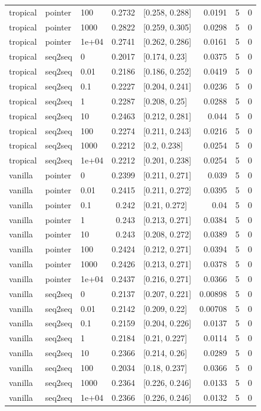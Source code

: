 \documentclass[10pt]{article}
\begin{document}
{\begin{longtable}{lllrlrrr}
tropical & pointer & 100 & 0.2732 & [0.258, 0.288] & 0.0191 & 5 & 0\\
tropical & pointer & 1000 & 0.2822 & [0.259, 0.305] & 0.0298 & 5 & 0\\
tropical & pointer & 1e+04 & 0.2741 & [0.262, 0.286] & 0.0161 & 5 & 0\\
tropical & seq2seq & 0 & 0.2017 & [0.174, 0.23] & 0.0375 & 5 & 0\\
tropical & seq2seq & 0.01 & 0.2186 & [0.186, 0.252] & 0.0419 & 5 & 0\\
tropical & seq2seq & 0.1 & 0.2227 & [0.204, 0.241] & 0.0236 & 5 & 0\\
tropical & seq2seq & 1 & 0.2287 & [0.208, 0.25] & 0.0288 & 5 & 0\\
tropical & seq2seq & 10 & 0.2463 & [0.212, 0.281] & 0.044 & 5 & 0\\
tropical & seq2seq & 100 & 0.2274 & [0.211, 0.243] & 0.0216 & 5 & 0\\
tropical & seq2seq & 1000 & 0.2212 & [0.2, 0.238] & 0.0254 & 5 & 0\\
tropical & seq2seq & 1e+04 & 0.2212 & [0.201, 0.238] & 0.0254 & 5 & 0\\
vanilla & pointer & 0 & 0.2399 & [0.211, 0.271] & 0.039 & 5 & 0\\
vanilla & pointer & 0.01 & 0.2415 & [0.211, 0.272] & 0.0395 & 5 & 0\\
vanilla & pointer & 0.1 & 0.242 & [0.21, 0.272] & 0.04 & 5 & 0\\
vanilla & pointer & 1 & 0.243 & [0.213, 0.271] & 0.0384 & 5 & 0\\
vanilla & pointer & 10 & 0.243 & [0.208, 0.272] & 0.0389 & 5 & 0\\
vanilla & pointer & 100 & 0.2424 & [0.212, 0.271] & 0.0394 & 5 & 0\\
vanilla & pointer & 1000 & 0.2426 & [0.213, 0.271] & 0.0378 & 5 & 0\\
vanilla & pointer & 1e+04 & 0.2437 & [0.216, 0.271] & 0.0366 & 5 & 0\\
vanilla & seq2seq & 0 & 0.2137 & [0.207, 0.221] & 0.00898 & 5 & 0\\
vanilla & seq2seq & 0.01 & 0.2142 & [0.209, 0.22] & 0.00708 & 5 & 0\\
vanilla & seq2seq & 0.1 & 0.2159 & [0.204, 0.226] & 0.0137 & 5 & 0\\
vanilla & seq2seq & 1 & 0.2184 & [0.21, 0.227] & 0.0114 & 5 & 0\\
vanilla & seq2seq & 10 & 0.2366 & [0.214, 0.26] & 0.0289 & 5 & 0\\
vanilla & seq2seq & 100 & 0.2034 & [0.18, 0.237] & 0.0366 & 5 & 0\\
vanilla & seq2seq & 1000 & 0.2364 & [0.226, 0.246] & 0.0133 & 5 & 0\\
vanilla & seq2seq & 1e+04 & 0.2366 & [0.226, 0.246] & 0.0132 & 5 & 0\\
\bottomrule
\end{longtable}
}
\end{document}
